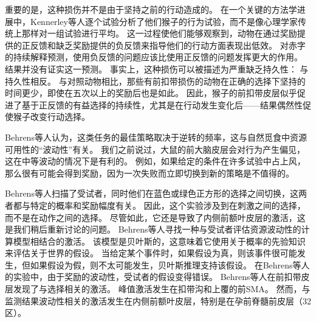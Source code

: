 重要的是，这种损伤并不是由于坚持之前的行动造成的。
在一个关键的方法学进展中，Kennerley等人逐个试验分析了他们猴子的行为试验，而不是像心理学家传统上那样对一组试验进行平均。
这一过程使他们能够观察到，动物在通过奖励提供的正反馈和缺乏奖励提供的负反馈来指导他们的行动方面表现出低效。
对赤字的持续解释预测，使用负反馈的问题应该比使用正反馈的问题发挥更大的作用。
结果并没有证实这一预测。
事实上，这种损伤可以被描述为严重缺乏持久性：
与持久性相反。
与对照动物相比，那些有前扣带损伤的动物在正确的选择下坚持的时间更少，即使在五次以上的奖励后也是如此。
因此，猴子的前扣带皮层似乎促进了基于正反馈的有益选择的持续性，尤其是在行动发生变化后——结果偶然性促使猴子改变行动选择。\par


Behrens等人\cite{behrens2007learning}认为，这类任务的最佳策略取决于逆转的频率，这与自然觅食中资源可用性的“波动性”有关。
我们之前说过，大鼠的前大脑皮层会对行为产生偏见，这在中等波动的情况下是有利的。
例如，如果给定的条件在许多试验中占上风，那么很有可能会得到奖励，因为一次失败而立即切换到新的策略是不值得的。\par


Behrens等人扫描了受试者，同时他们在蓝色或绿色正方形的选择之间切换，这两者都与特定的概率和奖励幅度有关。
因此，这个实验涉及到在刺激之间的选择，而不是在动作之间的选择。
尽管如此，它还是导致了内侧前额叶皮层的激活，这是我们稍后重新讨论的问题。
Behrens等人寻找一种与受试者评估资源波动性的计算模型相结合的激活。
该模型是贝叶斯的，这意味着它使用关于概率的先验知识来评估关于世界的假设。
当给定某个事件时，如果假设为真，则该事件很可能发生，但如果假设为假，则不太可能发生，贝叶斯推理支持该假设。
在Behrens等人的实验中，由于奖励的波动性，受试者的假设变得错误。
Behrens等人在前扣带皮层发现了与选择相关的激活。
峰值激活发生在扣带沟和上覆的前SMA。
然而，与监测结果波动性相关的激活发生在内侧前额叶皮层，特别是在孕前脊髓前皮层（32区）。\par


